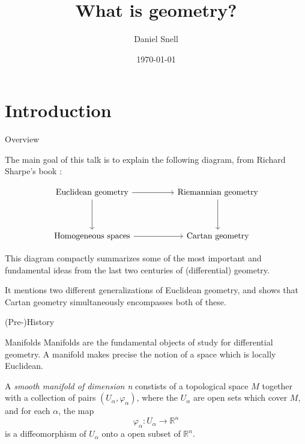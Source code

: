 \documentclass[handout]{beamer}
\title[What is geometry?]{What is geometry?}
\author[Daniel Snell]{Daniel Snell}
\date{\today}
\newcommand{\RR}{\mathbb{R}}
\renewcommand{\phi}{\varphi}
\begin{document}
\begin{frame}
  \titlepage
\end{frame}

\section{Introduction}

\begin{frame}{Overview}

  The main goal of this talk is to explain the following diagram, from Richard Sharpe's book \cite{Sharpe}:

\vspace{1em}
\[
\begin{tikzcd}[ampersand replacement=\&, row sep=huge, column sep=huge]
\textnormal{Euclidean geometry} \arrow[r] \arrow[d] \& \textnormal{Riemannian geometry} \arrow[d]\\
\textnormal{Homogeneous spaces} \arrow[r] \& \textnormal{Cartan geometry}
\end{tikzcd}
\]

\vspace{1em}

This diagram compactly summarizes some of the most important and fundamental ideas from the last two centuries of (differential) geometry.

It mentions two different generalizations of Euclidean geometry, and shows that Cartan geometry simultaneously encompasses both of these.

\end{frame}

\begin{frame}{(Pre-)History}

\end{frame}

\begin{frame}{Manifolds}
  Manifolds are the fundamental objects of study for differential geometry. 
  A manifold makes precise the notion of a space which is locally Euclidean.
  \begin{definition}
    A \emph{smooth manifold of dimension n} constists of a topological space $M$ together with a collection of pairs $(U_\alpha, \phi_\alpha)$, where the $U_\alpha$ are open sets which cover $M$, and for each $\alpha$, the map
    \[
      \phi_\alpha : U_\alpha \to \RR^n
    \]
    is a diffeomorphism of $U_\alpha$ onto a open subset of $\RR^n$.
  \end{definition}
\end{frame}
\end{document}
